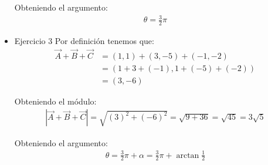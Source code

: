 \documentclass[12pt,openany]{book}
\begin{document}
\begin{itemize}
				\noindent Obteniendo el argumento:\\
				\begin{equation*}
			    	\begin{split}
			    		\theta = \frac{3}{2}\pi
					\end{split}
				\end{equation*}

				\item Ejercicio 3
		    	\noindent Por definici\'on tenemos que:
		    	\begin{equation*}
			    	\begin{split}
						\vec{A}+\vec{B}+\vec{C} &=(1,1)+(3,-5)+ (-1,-2) \\
		    			&=(1 +3+(-1) , 1 +(-5)+(-2)) \\
		    			&=(3, -6)
					\end{split}
				\end{equation*}

				\noindent Obteniendo el m\'odulo:\\
				\begin{equation*}
			    	\begin{split}
						|\vec{A}+\vec{B}+\vec{C}|= \sqrt{(3)^{2}+(-6)^{2}}
						=\sqrt{9+36}
						=\sqrt{45}
						=3\sqrt{5}
					\end{split}
				\end{equation*}

				\noindent Obteniendo el argumento:\\
				\begin{equation*}
			    	\begin{split}
			    		\theta = \frac{3}{2}\pi + \alpha
			    		=\frac{3}{2}\pi + \arctan\frac{1}{2}
					\end{split}
				\end{equation*}
			\end{itemize}
			
\end{document}
